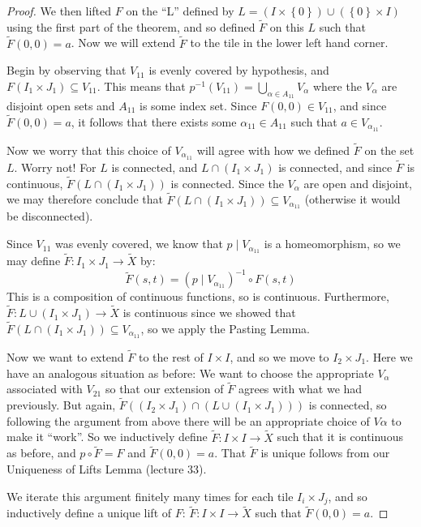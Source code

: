 \documentclass[11pt,reqno]{amsart}
\theoremstyle{definition}
\begin{document}
\begin{proof}
We then lifted $F$ on the ``L'' defined by $L=(I\times \left\{0\right\})\cup (\left\{0\right\} \times I)$ using the first part of the theorem, and so defined $\tilde{F}$ on this $L$ such that $\tilde{F}(0,0)=a$. Now we will extend $\tilde{F}$ to the tile in the lower left hand corner.
	\par
	Begin by observing that $V_{11}$ is evenly covered by hypothesis, and $F(I_1\times J_1)\subseteq V_{11}$. This means that $p^{-1}(V_{11})=\bigcup_{\alpha \in A_{11}}V_\alpha$ where the $V_\alpha$ are disjoint open sets and $A_{11}$ is some index set. Since $F(0,0)\in V_{11}$, and since $\tilde{F}(0,0)=a$, it follows that there exists some $\alpha_{11}\in A_{11}$ such that $a\in V_{\alpha_ {11}}$.
	\par
	Now we worry that this choice of $V_{\alpha_{11}}$ will agree with how we defined $\tilde{F}$ on the set $L$. Worry not! For $L$ is connected, and $L\cap (I_1\times J_1)$ is connected, and since $\tilde{F}$ is continuous, $\tilde{F}(L\cap (I_1\times J_1))$ is connected. Since the $V_\alpha$ are open and disjoint, we may therefore conclude that $\tilde{F}(L\cap (I_1\times J_1))\subseteq V_{\alpha_{11}}$ (otherwise it would be disconnected).
	\par
	Since $V_11$ was evenly covered, we know that $p\mid V_{\alpha_{11}}$ is a homeomorphism, so we may define $\tilde{F}\colon I_1\times J_1\to \tilde{X}$ by:
	\[ \tilde{F}(s,t)=(p\mid V_{\alpha_{11}})^{-1}\circ F(s,t)
	\]
	\newpage
	This is a composition of continuous functions, so is continuous. Furthermore, $\tilde{F}\colon L\cup (I_1\times J_1)\to \tilde{X}$ is continuous since we showed that $\tilde{F}(L\cap (I_1\times J_1))\subseteq V_{\alpha_{11}}$, so we apply the Pasting Lemma.
	\par
    Now we want to extend $\tilde{F}$ to the rest of $I\times I$, and so we move to $I_2\times J_1$. Here we have an analogous situation as before: We want to choose the appropriate $V_\alpha$ associated with $V_{21}$ so that our extension of $\tilde{F}$ agrees with what we had previously. But again, $\tilde{F}((I_2\times J_1)\cap (L\cup (I_1\times J_1)))$ is connected, so following the argument from above there will be an appropriate choice of $V\alpha$ to make it ``work''. So we inductively define $\tilde{F}\colon I\times I\to \tilde{X}$ such that it is continuous as before, and $p\circ \tilde{F}=F$ and $\tilde{F}(0,0)=a$. That $\tilde{F}$ is unique follows from our Uniqueness of Lifts Lemma (lecture 33).
  \par We iterate this argument finitely many times for each tile $I_i\times J_j$, and so inductively define a unique lift of $F$: $\tilde{F}\colon I\times I\to \tilde{X}$ such that $\tilde{F}(0,0)=a$.
  \end{proof}
  \medskip
  
\end{document}
